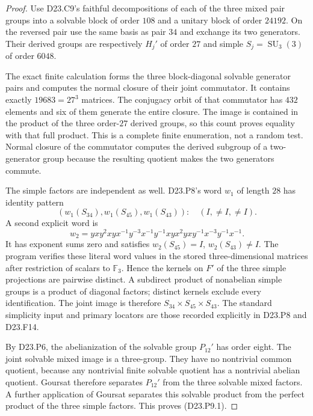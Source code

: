 \begin{proof}
Use D23.C9's faithful decompositions of each of the three mixed
pair groups into a solvable block of order $108$ and a unitary
block of order $24192$. On the reversed pair use the same basis
as pair $34$ and exchange its two generators. Their derived
groups are respectively $H_j'$ of order $27$ and simple
$S_j=\operatorname{SU}_3(3)$ of order $6048$.

The exact finite calculation
 forms the
three block-diagonal solvable generator pairs and computes the
normal closure of their joint commutator. It contains exactly
$19683=27^3$ matrices. The conjugacy orbit of that commutator
has $432$ elements and six of them generate the entire closure.
The image is contained in the product of the three order-$27$
derived groups, so this count proves equality with that full
product. This is a complete finite enumeration, not a random
test. Normal closure of the commutator computes the derived
subgroup of a two-generator group because the resulting
quotient makes the two generators commute.

The simple factors are independent as well. D23.P8's word
$w_1$ of length $28$ has identity pattern
\[
  (w_1(S_{34}),w_1(S_{45}),w_1(S_{43})):
       \quad(I,\ne I,\ne I).
\]
A second explicit word is
\[
 w_2=yxy^2xyx^{-1}y^{-3}x^{-1}y^{-1}
       xyx^2yxy^{-1}x^{-3}y^{-1}x^{-1}.
\tag{D23.P9.2}
\]
It has exponent sums zero and satisfies
$w_2(S_{45})=I$, $w_2(S_{43})\ne I$.
The program verifies these literal word values in the stored
three-dimensional matrices after restriction of scalars to
$\mathbb F_3$. Hence the kernels on $F'$ of the three simple
projections are pairwise distinct. A subdirect product of
nonabelian simple groups is a product of diagonal factors;
distinct kernels exclude every identification. The joint image
is therefore $S_{34}\times S_{45}\times S_{43}$.
The standard simplicity input and primary locators are those
recorded explicitly in D23.P8 and D23.F14.

By D23.P6, the abelianization of the solvable group $P_{12}'$
has order eight. The joint solvable mixed image is a three-group.
They have no nontrivial common quotient, because any nontrivial
finite solvable quotient has a nontrivial abelian quotient.
Goursat therefore separates $P_{12}'$ from the three solvable
mixed factors. A further application of Goursat separates this
solvable product from the perfect product of the three simple
factors. This proves (D23.P9.1).


\end{proof}
